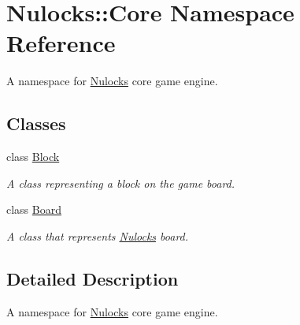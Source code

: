 \hypertarget{namespace_nulocks_1_1_core}{\section{Nulocks\-:\-:Core Namespace Reference}
\label{namespace_nulocks_1_1_core}
}


A namespace for \hyperlink{namespace_nulocks}{Nulocks} core game engine.  


\subsection*{Classes}
\begin{DoxyCompactItemize}
\item 
class \hyperlink{class_nulocks_1_1_core_1_1_block}{Block}
\begin{DoxyCompactList}\small\item\em A class representing a block on the game board. \end{DoxyCompactList}\item 
class \hyperlink{class_nulocks_1_1_core_1_1_board}{Board}
\begin{DoxyCompactList}\small\item\em A class that represents \hyperlink{namespace_nulocks}{Nulocks} board. \end{DoxyCompactList}\end{DoxyCompactItemize}


\subsection{Detailed Description}
A namespace for \hyperlink{namespace_nulocks}{Nulocks} core game engine. 